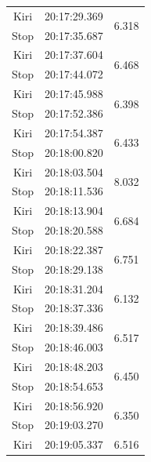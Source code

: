 \begin{longtable}{|c|c|c|}
  Kiri           & 20:17:29.369        & \multirow{2}{*}{6.318}  \\ \cline{1-2}
  Stop           & 20:17:35.687        &                         \\ \hline
  Kiri           & 20:17:37.604        & \multirow{2}{*}{6.468}  \\ \cline{1-2}
  Stop           & 20:17:44.072        &                         \\ \hline
  Kiri           & 20:17:45.988        & \multirow{2}{*}{6.398}  \\ \cline{1-2}
  Stop           & 20:17:52.386        &                         \\ \hline
  Kiri           & 20:17:54.387        & \multirow{2}{*}{6.433}  \\ \cline{1-2}
  Stop           & 20:18:00.820        &                         \\ \hline
  Kiri           & 20:18:03.504        & \multirow{2}{*}{8.032}  \\ \cline{1-2}
  Stop           & 20:18:11.536        &                         \\ \hline
  Kiri           & 20:18:13.904        & \multirow{2}{*}{6.684}  \\ \cline{1-2}
  Stop           & 20:18:20.588        &                         \\ \hline
  Kiri           & 20:18:22.387        & \multirow{2}{*}{6.751}  \\ \cline{1-2}
  Stop           & 20:18:29.138        &                         \\ \hline
  Kiri           & 20:18:31.204        & \multirow{2}{*}{6.132}  \\ \cline{1-2}
  Stop           & 20:18:37.336        &                         \\ \hline
  Kiri           & 20:18:39.486        & \multirow{2}{*}{6.517}  \\ \cline{1-2}
  Stop           & 20:18:46.003        &                         \\ \hline
  Kiri           & 20:18:48.203        & \multirow{2}{*}{6.450}  \\ \cline{1-2}
  Stop           & 20:18:54.653        &                         \\ \hline
  Kiri           & 20:18:56.920        & \multirow{2}{*}{6.350}  \\ \cline{1-2}
  Stop           & 20:19:03.270        &                         \\ \hline
  Kiri           & 20:19:05.337        & \multirow{2}{*}{6.516}  \\ \cline{1-2}

\end{longtable}
